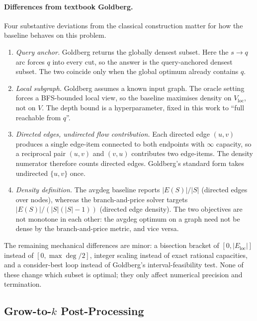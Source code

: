 \documentclass[11pt]{article}
\begin{document}
\paragraph{Differences from textbook Goldberg.}
Four substantive deviations from the classical construction matter for how the
baseline behaves on this problem.
\begin{enumerate}[leftmargin=1.1cm]
  \item \emph{Query anchor.} Goldberg returns the globally densest subset.
  Here the $s \to q$ arc forces $q$ into every cut, so the answer is the
  query-anchored densest subset. The two coincide only when the global optimum
  already contains $q$.
  \item \emph{Local subgraph.} Goldberg assumes a known input graph. The oracle
  setting forces a BFS-bounded local view, so the baseline maximises density on
  $V_{\mathrm{loc}}$, not on $V$. The depth bound is a hyperparameter, fixed in
  this work to ``full reachable from $q$''.
  \item \emph{Directed edges, undirected flow contribution.} Each directed edge
  $(u,v)$ produces a single edge-item connected to both endpoints with
  $\infty$ capacity, so a reciprocal pair $(u,v)$ and $(v,u)$ contributes two
  edge-items. The density numerator therefore counts directed edges. Goldberg's
  standard form takes undirected $\{u,v\}$ once.
  \item \emph{Density definition.} The avgdeg baseline reports
  $|E(S)| / |S|$ (directed edges over nodes), whereas the branch-and-price
  solver targets $|E(S)| / (|S|(|S|-1))$ (directed edge density). The two
  objectives are not monotone in each other: the avgdeg optimum on a graph need
  not be dense by the branch-and-price metric, and vice versa.
\end{enumerate}

The remaining mechanical differences are minor: a bisection bracket of
$[0, |E_{\mathrm{loc}}|]$ instead of $[0, \max\deg / 2]$, integer scaling
instead of exact rational capacities, and a consider-best loop instead of
Goldberg's interval-feasibility test. None of these change which subset is
optimal; they only affect numerical precision and termination.

\subsection{Grow-to-\texorpdfstring{$k$}{k} Post-Processing}
\label{sec:grow-to-k}
\end{document}
